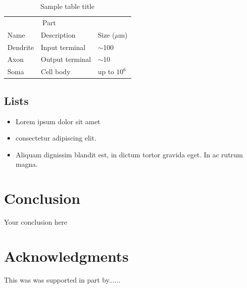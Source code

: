 \documentclass{article}
\begin{document}
\begin{table}
 \caption{Sample table title}
  \centering
  \begin{tabular}{lll}
    \toprule
    \multicolumn{2}{c}{Part}                   \\
    \cmidrule(r){1-2}
    Name     & Description     & Size ($\mu$m) \\
    \midrule
    Dendrite & Input terminal  & $\sim$100     \\
    Axon     & Output terminal & $\sim$10      \\
    Soma     & Cell body       & up to $10^6$  \\
    \bottomrule
  \end{tabular}
  \label{tab:table}
\end{table}

\subsection{Lists}
\begin{itemize}
\item Lorem ipsum dolor sit amet
\item consectetur adipiscing elit. 
\item Aliquam dignissim blandit est, in dictum tortor gravida eget. In ac rutrum magna.
\end{itemize}


\section{Conclusion}
Your conclusion here

\section*{Acknowledgments}
This was was supported in part by......

  
  
\end{document}
